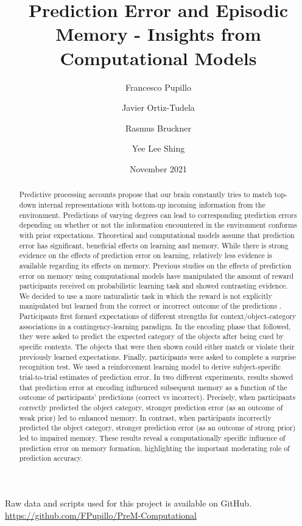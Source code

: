 \documentclass[a4paper,12pt]{article}
\title{Prediction Error and Episodic Memory - Insights from Computational Models}
\author[1]{Francesco Pupillo}
\author[1]{Javier Ortiz-Tudela}
\author[2]{Rasmus Bruckner}
\author[1]{Yee Lee Shing}
\affil[1]{Goethe-Universität Frankfurt}
\affil[2]{Freie Universität Berlin}
\date{November 2021}
\begin{document}
{
\hypersetup{linkcolor=black}
\tableofcontents
}
\setlength{\parindent}{10ex}

\maketitle

\noindent
Raw data and scripts used for this project is available on GitHub. \url{https://github.com/FPupillo/PreM-Computational} 

\doublespacing

\begin{abstract}
\noindent
Predictive processing accounts propose that our brain constantly tries to match top-down internal representations with bottom-up incoming information from the environment. Predictions of varying degrees can lead to corresponding prediction errors depending on whether or not the information encountered in the environment conforms with prior expectations. Theoretical and computational models assume that prediction error has significant, beneficial effects on learning and memory. While there is strong evidence on the effects of prediction error on learning, relatively less evidence is available regarding its effects on memory. Previous studies on the effects of prediction error on memory using computational models have manipulated the amount of reward participants received on probabilistic learning task and showed contrasting evidence. We decided to use a more naturalistic task in which the reward is not explicitly manipulated but learned from the correct or incorrect outcome of the predictions . Participants first formed expectations of different strengths for context/object-category associations in a contingency-learning paradigm. In the encoding phase that followed, they were asked to predict the expected category of the objects after being cued by specific contexts. The objects that were then shown could either match or violate their previously learned expectations. Finally, participants were asked to complete a surprise recognition test. We used a reinforcement learning model to derive subject-specific trial-to-trial estimates of prediction error. In two different experiments, results showed that prediction error at encoding influenced subsequent memory as a function of the outcome of participants’ predictions (correct vs incorrect). Precisely, when participants correctly predicted the object category, stronger prediction error (as an outcome of weak prior) led to enhanced memory. In contrast, when participants incorrectly predicted the object category, stronger prediction error (as an outcome of strong prior) led to impaired memory. These results reveal a computationally specific influence of prediction error on memory formation, highlighting the important moderating role of prediction accuracy.     
\end{abstract}
\end{document}
